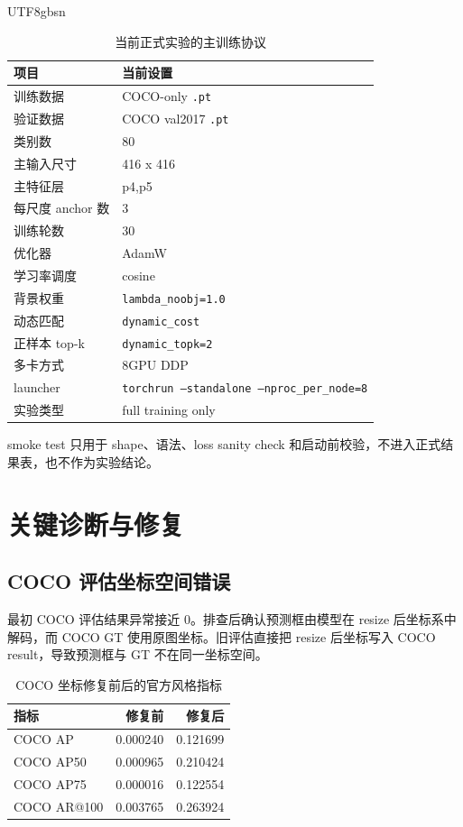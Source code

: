 \documentclass[11pt,a4paper]{article}
\begin{document}
\begin{CJK*}{UTF8}{gbsn}
\begin{table}[H]
  \centering
  \caption{当前正式实验的主训练协议}
  \label{tab:shared-protocol}
  \begin{tabular}{ll}
    \toprule
    项目 & 当前设置 \\
    \midrule
    训练数据 & COCO-only \texttt{.pt} \\
    验证数据 & COCO val2017 \texttt{.pt} \\
    类别数 & 80 \\
    主输入尺寸 & 416 x 416 \\
    主特征层 & p4,p5 \\
    每尺度 anchor 数 & 3 \\
    训练轮数 & 30 \\
    优化器 & AdamW \\
    学习率调度 & cosine \\
    背景权重 & \texttt{lambda\_noobj=1.0} \\
    动态匹配 & \texttt{dynamic\_cost} \\
    正样本 top-k & \texttt{dynamic\_topk=2} \\
    多卡方式 & 8GPU DDP \\
    launcher & \texttt{torchrun --standalone --nproc\_per\_node=8} \\
    实验类型 & full training only \\
    \bottomrule
  \end{tabular}
\end{table}

smoke test 只用于 shape、语法、loss sanity check 和启动前校验，不进入正式结果表，也不作为实验结论。

\section{关键诊断与修复}

\subsection{COCO 评估坐标空间错误}

最初 COCO 评估结果异常接近 0。排查后确认预测框由模型在 resize 后坐标系中解码，而 COCO GT 使用原图坐标。旧评估直接把 resize 后坐标写入 COCO result，导致预测框与 GT 不在同一坐标空间。

\begin{table}[H]
  \centering
  \caption{COCO 坐标修复前后的官方风格指标}
  \label{tab:coco-coord-fix}
  \begin{tabular}{lrr}
    \toprule
    指标 & 修复前 & 修复后 \\
    \midrule
    COCO AP & 0.000240 & 0.121699 \\
    COCO AP50 & 0.000965 & 0.210424 \\
    COCO AP75 & 0.000016 & 0.122554 \\
    COCO AR@100 & 0.003765 & 0.263924 \\
    \bottomrule
  \end{tabular}
\end{table}


\end{CJK*}
\end{document}
